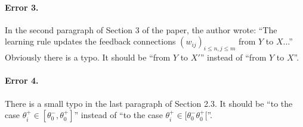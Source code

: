 \paragraph{Error 3.} 
In the second paragraph of Section 3 of the paper, the author wrote:
``The learning rule updates the feedback connections $(w_{ij})_{i\leq n,j\leq m}$ from $Y$ to $X$...''
Obviously there is a typo. It should be ``from $Y$ to $X'$'' instead of ``from $Y$ to $X$''.

\paragraph{Error 4.}
There is a small typo in the last paragraph of Section 2.3. 
It should be ``to the case $\theta_i^+ \in [\theta_0^-, \theta_0^+]$'' instead of 
``to the case $\theta_i^+ \in [\theta_0^-\theta_0^+[$''.


